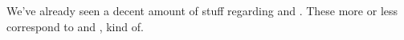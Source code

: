 We've already seen a decent amount of stuff regarding \ESU{} and \EAS{}.
These more or less correspond to \AR{} and \WR{}, kind of.








